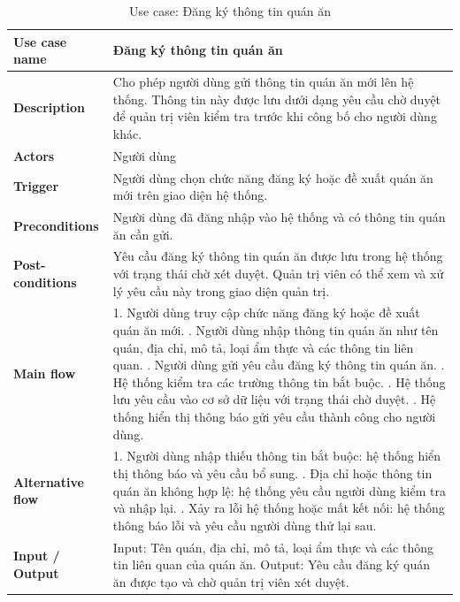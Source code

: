 \begin{longtable}{|p{4cm}|p{10cm}|}
\caption{Use case: Đăng ký thông tin quán ăn}
\label{tab:usecase-register-restaurant} \\

\endfirsthead

\endhead

\endfoot

\endlastfoot

\hline
\textbf{Use case name} &
Đăng ký thông tin quán ăn \\
\hline

\textbf{Description} &
Cho phép người dùng gửi thông tin quán ăn mới lên hệ thống. Thông tin này được lưu dưới dạng yêu cầu chờ duyệt để quản trị viên kiểm tra trước khi công bố cho người dùng khác. \\
\hline

\textbf{Actors} &
Người dùng \\
\hline

\textbf{Trigger} &
Người dùng chọn chức năng đăng ký hoặc đề xuất quán ăn mới trên giao diện hệ thống. \\
\hline

\textbf{Preconditions} &
Người dùng đã đăng nhập vào hệ thống và có thông tin quán ăn cần gửi. \\
\hline

\textbf{Post-conditions} &
Yêu cầu đăng ký thông tin quán ăn được lưu trong hệ thống với trạng thái chờ xét duyệt. Quản trị viên có thể xem và xử lý yêu cầu này trong giao diện quản trị. \\
\hline

\textbf{Main flow} &
1. Người dùng truy cập chức năng đăng ký hoặc đề xuất quán ăn mới. \newline
2. Người dùng nhập thông tin quán ăn như tên quán, địa chỉ, mô tả, loại ẩm thực và các thông tin liên quan. \newline
3. Người dùng gửi yêu cầu đăng ký thông tin quán ăn. \newline
4. Hệ thống kiểm tra các trường thông tin bắt buộc. \newline
5. Hệ thống lưu yêu cầu vào cơ sở dữ liệu với trạng thái chờ duyệt. \newline
6. Hệ thống hiển thị thông báo gửi yêu cầu thành công cho người dùng. \\
\hline

\textbf{Alternative flow} &
1. Người dùng nhập thiếu thông tin bắt buộc: hệ thống hiển thị thông báo và yêu cầu bổ sung. \newline
2. Địa chỉ hoặc thông tin quán ăn không hợp lệ: hệ thống yêu cầu người dùng kiểm tra và nhập lại. \newline
3. Xảy ra lỗi hệ thống hoặc mất kết nối: hệ thống thông báo lỗi và yêu cầu người dùng thử lại sau. \\
\hline

\textbf{Input / Output} &
Input: Tên quán, địa chỉ, mô tả, loại ẩm thực và các thông tin liên quan của quán ăn. \newline
Output: Yêu cầu đăng ký quán ăn được tạo và chờ quản trị viên xét duyệt. \\
\hline

\end{longtable}
\endgroup

